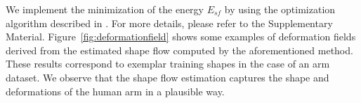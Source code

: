 We implement the minimization of the energy $E_{sf}$ by using the optimization algorithm described in \cite{Garg:2013hu}. For more details, please refer to the Supplementary Material.
%
Figure~\ref{fig:deformationfield} shows some examples of deformation fields derived from the estimated shape flow computed by the aforementioned method. These results correspond to exemplar training shapes in the case of an arm dataset. We observe that the shape flow estimation captures the shape and deformations of the human arm in a plausible way.







